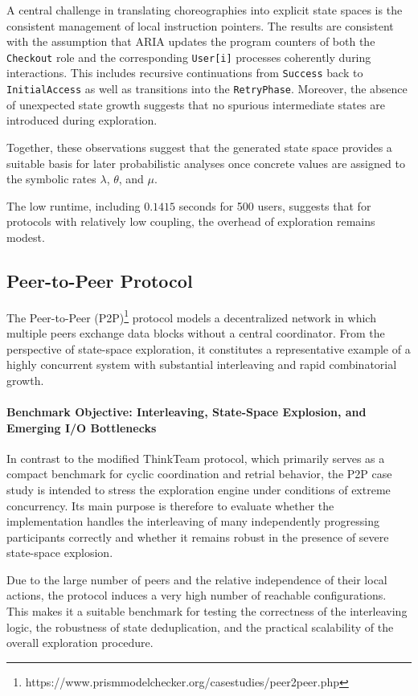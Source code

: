 A central challenge in translating choreographies into explicit state spaces is the consistent management of local instruction pointers. The results are consistent with the assumption that \textsc{ARIA} updates the program counters of both the \texttt{Checkout} role and the corresponding \texttt{User[i]} processes coherently during interactions. This includes recursive continuations from \texttt{Success} back to \texttt{InitialAccess} as well as transitions into the \texttt{RetryPhase}. Moreover, the absence of unexpected state growth suggests that no spurious intermediate states are introduced during exploration.

Together, these observations suggest that the generated state space provides a suitable basis for later probabilistic analyses once concrete values are assigned to the symbolic rates $\lambda$, $\theta$, and $\mu$.

The low runtime, including $0.1415$ seconds for 500 users, suggests that for protocols with relatively low coupling, the overhead of exploration remains modest.

\subsection{Peer-to-Peer Protocol}
\label{sec:p2p}

The Peer-to-Peer (P2P)\footnote{https://www.prismmodelchecker.org/casestudies/peer2peer.php} protocol models a decentralized network in which multiple peers exchange data blocks without a central coordinator. From the perspective of state-space exploration, it constitutes a representative example of a highly concurrent system with substantial interleaving and rapid combinatorial growth.

\paragraph{Benchmark Objective: Interleaving, State-Space Explosion, and Emerging I/O Bottlenecks}
In contrast to the modified ThinkTeam protocol, which primarily serves as a compact benchmark for cyclic coordination and retrial behavior, the P2P case study is intended to stress the exploration engine under conditions of extreme concurrency. Its main purpose is therefore to evaluate whether the implementation handles the interleaving of many independently progressing participants correctly and whether it remains robust in the presence of severe state-space explosion.

Due to the large number of peers and the relative independence of their local actions, the protocol induces a very high number of reachable configurations. This makes it a suitable benchmark for testing the correctness of the interleaving logic, the robustness of state deduplication, and the practical scalability of the overall exploration procedure.

